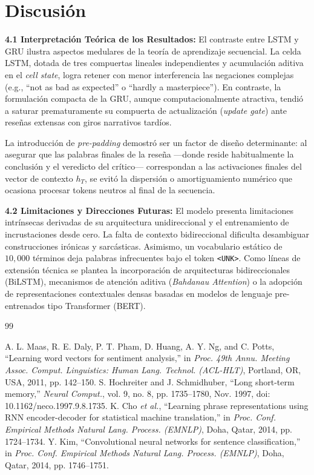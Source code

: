 \documentclass[letterpaper, 10 pt, conference]{ieeeconf}
\begin{document}
\section{Discusión}

\textbf{4.1 Interpretación Teórica de los Resultados:}
El contraste entre LSTM y GRU ilustra aspectos medulares de la teoría de aprendizaje secuencial. La celda LSTM, dotada de tres compuertas lineales independientes y acumulación aditiva en el \textit{cell state}, logra retener con menor interferencia las negaciones complejas (e.g., ``not as bad as expected'' o ``hardly a masterpiece''). En contraste, la formulación compacta de la GRU, aunque computacionalmente atractiva, tendió a saturar prematuramente su compuerta de actualización (\textit{update gate}) ante reseñas extensas con giros narrativos tardíos.

La introducción de \textit{pre-padding} demostró ser un factor de diseño determinante: al asegurar que las palabras finales de la reseña —donde reside habitualmente la conclusión y el veredicto del crítico— correspondan a las activaciones finales del vector de contexto $h_T$, se evitó la dispersión o amortiguamiento numérico que ocasiona procesar tokens neutros al final de la secuencia.

\textbf{4.2 Limitaciones y Direcciones Futuras:}
El modelo presenta limitaciones intrínsecas derivadas de su arquitectura unidireccional y el entrenamiento de incrustaciones desde cero. La falta de contexto bidireccional dificulta desambiguar construcciones irónicas y sarcásticas. Asimismo, un vocabulario estático de $10{,}000$ términos deja palabras infrecuentes bajo el token \texttt{<UNK>}. Como líneas de extensión técnica se plantea la incorporación de arquitecturas bidireccionales (BiLSTM), mecanismos de atención aditiva (\textit{Bahdanau Attention}) o la adopción de representaciones contextuales densas basadas en modelos de lenguaje pre-entrenados tipo Transformer (BERT).

\begin{thebibliography}{99}

 A. L. Maas, R. E. Daly, P. T. Pham, D. Huang, A. Y. Ng, and C. Potts, ``Learning word vectors for sentiment analysis,'' in \textit{Proc. 49th Annu. Meeting Assoc. Comput. Linguistics: Human Lang. Technol. (ACL-HLT)}, Portland, OR, USA, 2011, pp. 142--150.
 S. Hochreiter and J. Schmidhuber, ``Long short-term memory,'' \textit{Neural Comput.}, vol. 9, no. 8, pp. 1735--1780, Nov. 1997, doi: 10.1162/neco.1997.9.8.1735.
 K. Cho \textit{et al.}, ``Learning phrase representations using RNN encoder-decoder for statistical machine translation,'' in \textit{Proc. Conf. Empirical Methods Natural Lang. Process. (EMNLP)}, Doha, Qatar, 2014, pp. 1724--1734.
 Y. Kim, ``Convolutional neural networks for sentence classification,'' in \textit{Proc. Conf. Empirical Methods Natural Lang. Process. (EMNLP)}, Doha, Qatar, 2014, pp. 1746--1751.

\end{thebibliography}
\end{document}
